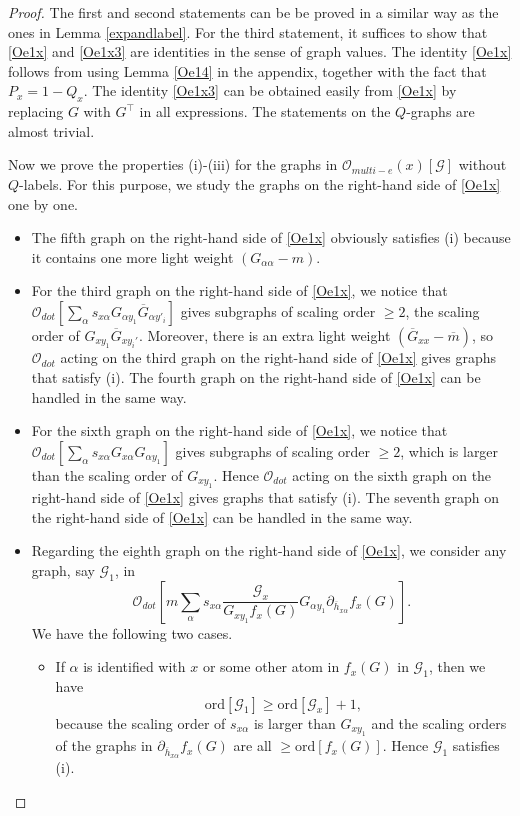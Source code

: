 \documentclass{article}
\newcommand{\1}{\mathds{1}}
\numberwithin{equation}{section}
\newcommand{\ord}{{\rm{ord}}}
\newcommand{\al}{\alpha}
\newcommand{\be}{\begin{equation}}
\newcommand{\ee}{\end{equation}}
\renewcommand{\cal}{\mathcal}
\renewcommand{\geq}{\geqslant}
\renewcommand{\ge}{\geq}
\theoremstyle{plain} %
\theoremstyle{remark}
\begin{document}
   \begin{proof} 
   The first and second statements can be be proved in a similar way as the ones in Lemma \ref{expandlabel}. 
For the third statement, it suffices to show that \eqref{Oe1x} and \eqref{Oe1x3} are identities in the sense of graph values. The identity \eqref{Oe1x} follows from using Lemma \ref{Oe14} in the appendix, together with the fact that 
 $P_x = 1-Q_x$. The identity \eqref{Oe1x3} can be obtained easily from \eqref{Oe1x} by replacing $G$ with $G^\top$ in all expressions. The statements on the $Q$-graphs are almost trivial.
 
 Now we prove the properties (i)-(iii) for the graphs in ${\cal O}_{multi-e}(x)[\cal G]$ without $Q$-labels. For this purpose, we study the graphs on the right-hand side of \eqref{Oe1x} one by one. 
 \begin{itemize}
 \item[(1)] The fifth graph on the right-hand side of \eqref{Oe1x} obviously satisfies (i) %
 because it contains one more light weight $(G_{\al\al}-m)$. 
 
\item[(2)] For the third graph on the right-hand side of \eqref{Oe1x}, we notice that $ \cal O_{dot}\left[ \sum_\al s_{x\al }G_{\al y_1} \overline G_{\al y'_i}\right]$ gives subgraphs of scaling order $\ge 2$, the scaling order of $G_{x y_1} \overline G_{xy_i'}$. Moreover, there is an extra light weight $(\overline G_{xx} -\overline m)$, so $\cal O_{dot}$ acting on the third graph on the right-hand side of \eqref{Oe1x} gives graphs that satisfy (i). The fourth graph on the right-hand side of \eqref{Oe1x} can be handled in the same way.

\item[(3)] For the sixth graph on the right-hand side of \eqref{Oe1x}, we notice that $ \cal O_{dot}\left[ \sum_\al s_{x\al }G_{x \al}G_{\al y_1}  \right]$ gives subgraphs of scaling order $\ge 2$, which is larger than the scaling order of $G_{xy_1}$. Hence $\cal O_{dot}$ acting on the sixth graph on the right-hand side of \eqref{Oe1x} gives graphs that satisfy (i). The seventh graph on the right-hand side of \eqref{Oe1x} can be handled in the same way.

\item[(4)] Regarding the eighth graph on the right-hand side of \eqref{Oe1x}, we consider any graph, say $\cal G_1$, in $$\cal O_{dot}\left[m    \sum_\al s_{x\al } \frac{\cal G_x}{G_{x y_1}f_x(G)}G_{\al y_1}\partial_{\overline h_{x\al}}f_x(G)\right].$$
We have the following two cases.
\begin{itemize}
\item If $\al$ is identified with $x$ or some other atom in $f_x(G)$ in $\cal G_1$, then we have
\be\label{larger weight}\text{ord} \left[ \cal G_1 \right] \ge \text{ord} \left[\cal G_x\right] + 1 ,\ee
because the scaling order of $s_{x\al}$ is larger than $G_{xy_1}$ and the scaling orders of the graphs in $ \partial_{\overline h_{x\al}}f_x(G) $ are all $ \ge \text{ord}[f_x(G) ] $. Hence $\cal G_1$ satisfies (i).


\end{itemize}
\end{itemize}
\end{proof}
\end{document}
